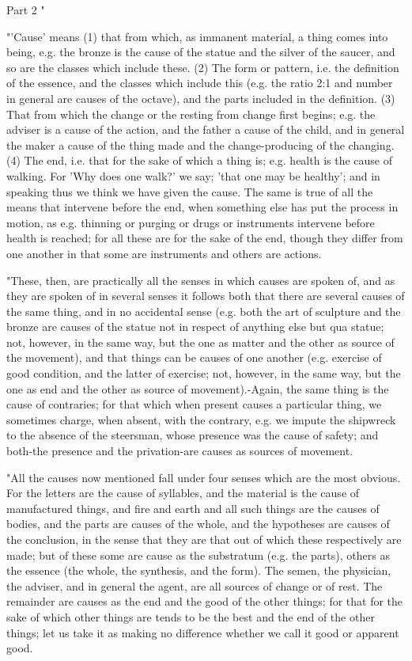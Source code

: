 Part 2 "

"'Cause' means (1) that from which, as immanent material, a thing
comes into being, e.g. the bronze is the cause of the statue and the
silver of the saucer, and so are the classes which include these.
(2) The form or pattern, i.e. the definition of the essence, and the
classes which include this (e.g. the ratio 2:1 and number in general
are causes of the octave), and the parts included in the definition.
(3) That from which the change or the resting from change first begins;
e.g. the adviser is a cause of the action, and the father a cause
of the child, and in general the maker a cause of the thing made and
the change-producing of the changing. (4) The end, i.e. that for the
sake of which a thing is; e.g. health is the cause of walking. For
'Why does one walk?' we say; 'that one may be healthy'; and in speaking
thus we think we have given the cause. The same is true of all the
means that intervene before the end, when something else has put the
process in motion, as e.g. thinning or purging or drugs or instruments
intervene before health is reached; for all these are for the sake
of the end, though they differ from one another in that some are instruments
and others are actions. 

"These, then, are practically all the senses in which causes are spoken
of, and as they are spoken of in several senses it follows both that
there are several causes of the same thing, and in no accidental sense
(e.g. both the art of sculpture and the bronze are causes of the statue
not in respect of anything else but qua statue; not, however, in the
same way, but the one as matter and the other as source of the movement),
and that things can be causes of one another (e.g. exercise of good
condition, and the latter of exercise; not, however, in the same way,
but the one as end and the other as source of movement).-Again, the
same thing is the cause of contraries; for that which when present
causes a particular thing, we sometimes charge, when absent, with
the contrary, e.g. we impute the shipwreck to the absence of the steersman,
whose presence was the cause of safety; and both-the presence and
the privation-are causes as sources of movement. 

"All the causes now mentioned fall under four senses which are the
most obvious. For the letters are the cause of syllables, and the
material is the cause of manufactured things, and fire and earth and
all such things are the causes of bodies, and the parts are causes
of the whole, and the hypotheses are causes of the conclusion, in
the sense that they are that out of which these respectively are made;
but of these some are cause as the substratum (e.g. the parts), others
as the essence (the whole, the synthesis, and the form). The semen,
the physician, the adviser, and in general the agent, are all sources
of change or of rest. The remainder are causes as the end and the
good of the other things; for that for the sake of which other things
are tends to be the best and the end of the other things; let us take
it as making no difference whether we call it good or apparent good.

